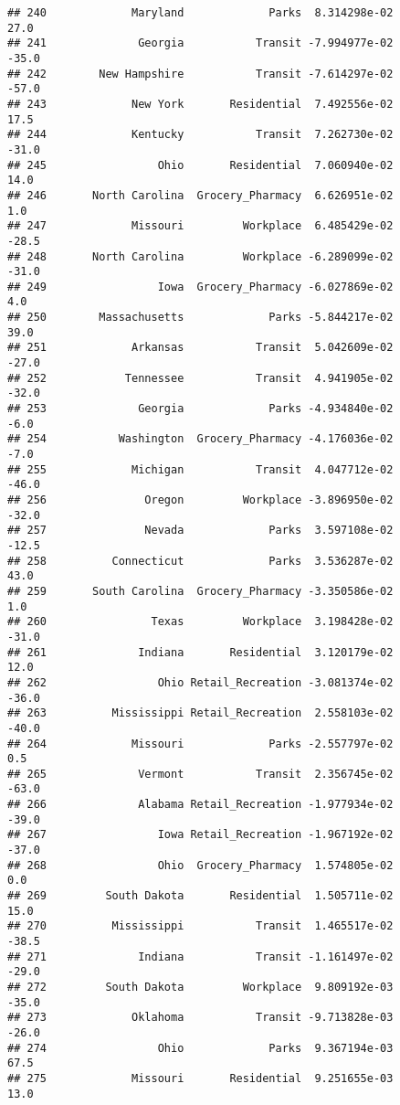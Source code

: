 \documentclass[]{article}
\begin{document}
\begin{verbatim}
## 240             Maryland             Parks  8.314298e-02          27.0
## 241              Georgia           Transit -7.994977e-02         -35.0
## 242        New Hampshire           Transit -7.614297e-02         -57.0
## 243             New York       Residential  7.492556e-02          17.5
## 244             Kentucky           Transit  7.262730e-02         -31.0
## 245                 Ohio       Residential  7.060940e-02          14.0
## 246       North Carolina  Grocery_Pharmacy  6.626951e-02           1.0
## 247             Missouri         Workplace  6.485429e-02         -28.5
## 248       North Carolina         Workplace -6.289099e-02         -31.0
## 249                 Iowa  Grocery_Pharmacy -6.027869e-02           4.0
## 250        Massachusetts             Parks -5.844217e-02          39.0
## 251             Arkansas           Transit  5.042609e-02         -27.0
## 252            Tennessee           Transit  4.941905e-02         -32.0
## 253              Georgia             Parks -4.934840e-02          -6.0
## 254           Washington  Grocery_Pharmacy -4.176036e-02          -7.0
## 255             Michigan           Transit  4.047712e-02         -46.0
## 256               Oregon         Workplace -3.896950e-02         -32.0
## 257               Nevada             Parks  3.597108e-02         -12.5
## 258          Connecticut             Parks  3.536287e-02          43.0
## 259       South Carolina  Grocery_Pharmacy -3.350586e-02           1.0
## 260                Texas         Workplace  3.198428e-02         -31.0
## 261              Indiana       Residential  3.120179e-02          12.0
## 262                 Ohio Retail_Recreation -3.081374e-02         -36.0
## 263          Mississippi Retail_Recreation  2.558103e-02         -40.0
## 264             Missouri             Parks -2.557797e-02           0.5
## 265              Vermont           Transit  2.356745e-02         -63.0
## 266              Alabama Retail_Recreation -1.977934e-02         -39.0
## 267                 Iowa Retail_Recreation -1.967192e-02         -37.0
## 268                 Ohio  Grocery_Pharmacy  1.574805e-02           0.0
## 269         South Dakota       Residential  1.505711e-02          15.0
## 270          Mississippi           Transit  1.465517e-02         -38.5
## 271              Indiana           Transit -1.161497e-02         -29.0
## 272         South Dakota         Workplace  9.809192e-03         -35.0
## 273             Oklahoma           Transit -9.713828e-03         -26.0
## 274                 Ohio             Parks  9.367194e-03          67.5
## 275             Missouri       Residential  9.251655e-03          13.0

\end{verbatim}
\end{document}
